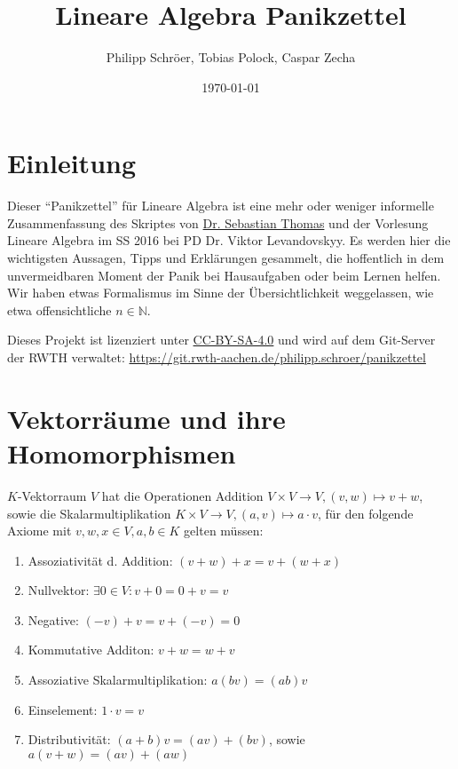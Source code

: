 \documentclass[11pt]{scrartcl}
\title{Lineare Algebra Panikzettel}
\author{Philipp Schröer, Tobias Polock, Caspar Zecha}
\date{\today}
\begin{document}
\maketitle

\setcounter{tocdepth}{2}
\tableofcontents

\section{Einleitung}

Dieser ``Panikzettel'' für Lineare Algebra ist eine mehr oder weniger informelle Zusammenfassung des Skriptes von \href{http://www.math.rwth-aachen.de/~Sebastian.Thomas/photo.jpg}{Dr. Sebastian Thomas} und der Vorlesung Lineare Algebra im SS 2016 bei PD Dr. Viktor Levandovskyy. Es werden hier die wichtigsten Aussagen, Tipps und Erklärungen gesammelt, die hoffentlich in dem unvermeidbaren Moment der Panik bei Hausaufgaben oder beim Lernen helfen. Wir haben etwas Formalismus im Sinne der Übersichtlichkeit weggelassen, wie etwa offensichtliche $n \in \mathbb{N}$.

Dieses Projekt ist lizenziert unter \href{https://creativecommons.org/licenses/by-sa/4.0/}{CC-BY-SA-4.0} und wird auf dem Git-Server der RWTH verwaltet: \url{https://git.rwth-aachen.de/philipp.schroer/panikzettel}

\section{Vektorräume und ihre Homomorphismen}

$K$-Vektorraum $V$ hat die Operationen Addition  $V \times V \to V, (v,w) \mapsto v+w$, sowie die Skalarmultiplikation $K \times V \to V, (a,v) \mapsto a \cdot v  $, für den folgende Axiome mit $v, w, x \in V, a,b \in K$ gelten müssen:

\begin{enumerate}
\item Assoziativität d. Addition: $(v+w)+x = v+(w+x)$
\item Nullvektor: $\exists 0 \in V: v+0=0+v=v$
\item Negative: $(-v)+v=v+(-v)=0$
\item Kommutative Additon: $v+w=w+v$
\item Assoziative Skalarmultiplikation: $a(bv)=(ab)v$
\item Einselement: $1\cdot v=v$
\item Distributivität: $(a+b)v=(av)+(bv)$, sowie $a(v+w)=(av)+(aw)$
\end{enumerate}
\end{document}
